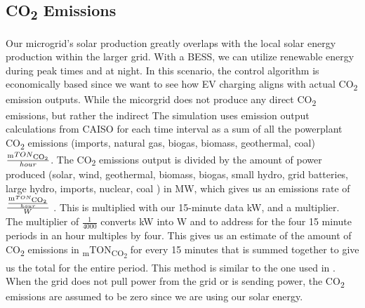 \documentclass[conference]{IEEEtran}
\begin{document}
    \subsection{CO\textsubscript{2} Emissions}
        	Our microgrid's solar production greatly overlaps with the local solar energy production within the larger grid.  With a BESS, we can utilize renewable energy during peak times and at night. In this scenario, the control algorithm is economically based since we want to see how EV charging aligns with actual CO\textsubscript{2} emission outputs.  While the micorgrid does not produce any direct CO\textsubscript{2} emissions, but rather the indirect The simulation uses emission output calculations from CAISO for each time interval as a sum of all the powerplant CO\textsubscript{2} emissions (imports, natural gas, biogas, biomass, geothermal, coal) $\frac{\textsubscript{m}TON\textsubscript{CO\textsubscript{2}}}{hour}$. The CO\textsubscript{2} emissions output is divided by the amount of power produced (solar, wind, geothermal, biomass, biogas, small hydro, grid batteries, large hydro, imports, nuclear, coal ) in MW, which gives us an emissions rate of $\frac{\frac{\textsubscript{m}TON\textsubscript{CO\textsubscript{2}}}{hour}}{W}$ . This is multiplied with our 15-minute data kW, and a multiplier. The multiplier of  $\frac{1}{4000}$ converts kW into W and to address for the four 15 minute periods in an hour multiples by four.  This gives us an estimate of the amount of CO\textsubscript{2} emissions in \textsubscript{m}TON\textsubscript{CO\textsubscript{2}} for every 15 minutes that is summed together to give us the total for the entire period.  This method is similar to the one used in \cite{garrido2021dynamic}.  When the grid does not pull power from the grid or is sending power, the CO\textsubscript{2} emissions are assumed to be zero since we are using our solar energy.
\end{document}
